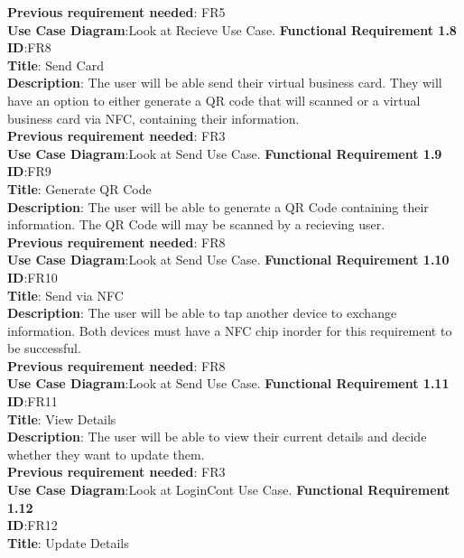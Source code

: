 \documentclass[english]{article}
\begin{document}
				\textbf{Previous requirement needed}: FR5\\
				\textbf{Use Case Diagram}:Look at Recieve Use Case.
				\textbf{Functional Requirement 1.8}\\
				\textbf{ID}:FR8\\
				\textbf{Title}: Send Card\\
				\textbf{Description}: The user will be able send their virtual business card. They will have an option to either generate a QR code that will scanned or a virtual business card via NFC, containing their information.\\
				\textbf{Previous requirement needed}: FR3\\
				\textbf{Use Case Diagram}:Look at Send Use Case.
				\textbf{Functional Requirement 1.9}\\
				\textbf{ID}:FR9\\
				\textbf{Title}: Generate QR Code\\
				\textbf{Description}: The user will be able to generate a QR Code containing their information. The QR Code will may be scanned by a recieving user.\\
				\textbf{Previous requirement needed}: FR8\\
				\textbf{Use Case Diagram}:Look at Send Use Case.
				\textbf{Functional Requirement 1.10}\\
				\textbf{ID}:FR10\\
				\textbf{Title}: Send via NFC\\
				\textbf{Description}: The user will be able to tap another device to exchange information. Both devices must have a NFC chip inorder for this requirement to be successful.\\
				\textbf{Previous requirement needed}: FR8\\
				\textbf{Use Case Diagram}:Look at Send Use Case.
				\textbf{Functional Requirement 1.11}\\
				\textbf{ID}:FR11\\
				\textbf{Title}: View Details\\
				\textbf{Description}: The user will be able to view their current details and decide whether they want to update them.\\
				\textbf{Previous requirement needed}: FR3\\
				\textbf{Use Case Diagram}:Look at LoginCont Use Case.
				\textbf{Functional Requirement 1.12}\\
				\textbf{ID}:FR12\\
				\textbf{Title}: Update Details\\
\end{document}
